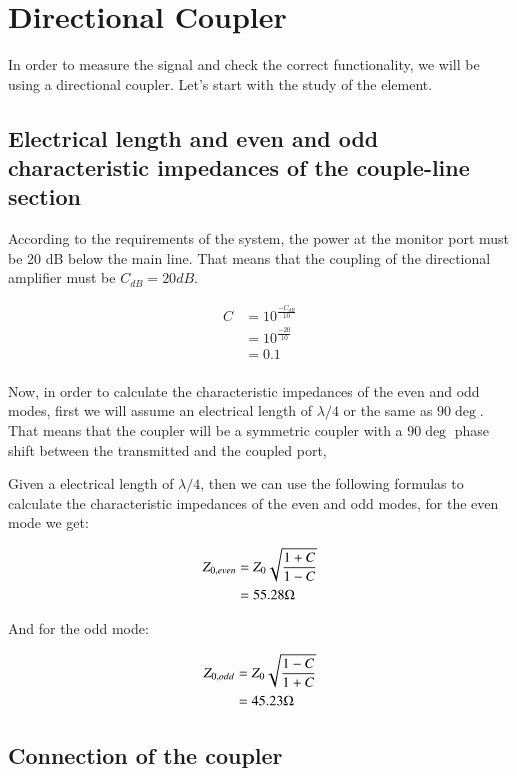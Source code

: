 \documentclass[12pt]{report} %
\begin{document}
\section{Directional Coupler}

In order to measure the signal and check the correct functionality, we will be using a directional coupler. Let's start with the study of the element.

\subsection{Electrical length and even and odd characteristic impedances of the couple-line section}

According to the requirements of the system, the power at the monitor port must be 20 dB below the main line. That means that the coupling of the directional amplifier must be $C_{dB} = 20 dB$.

\begin{align*}
C &= 10^{\frac{- C_{dB}}{10}} \\
&= 10^{\frac{- 20}{10}} \\
&= 0.1 \\
\end{align*}

Now, in order to calculate the characteristic impedances of the even and odd modes, first we will assume an electrical length of $\lambda / 4$ or the same as $90 \deg$. That means that the coupler will be a symmetric coupler with a $90 \deg$ phase shift between the transmitted and the coupled port,

Given a electrical length of $\lambda / 4$, then we can use the following formulas to calculate the characteristic impedances of the even and odd modes, for the even mode we get:

\begin{align*}
Z_{0, even} &= Z_{0} \* \sqrt{\frac{1 + C}{1 - C}} \\
&= 55.28 \Omega \\
\end{align*}

And for the odd mode:

\begin{align*}
Z_{0, odd} &= Z_{0} \* \sqrt{\frac{1 - C}{1 + C}} \\
&= 45.23 \Omega \\
\end{align*}

\subsection{Connection of the coupler}
\end{document}
